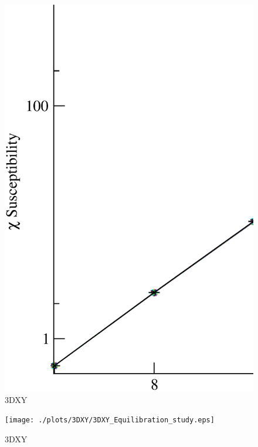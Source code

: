 \begin{figure}[!htpb]
  \centering
  \includegraphics[width=15cm]{./plots/3DXY/3DXY_Susceptibility_vs_L.eps}
  \caption{3DXY}
\end{figure}

\begin{figure}[!htpb]
  \centering
  \texttt{[image: ./plots/3DXY/3DXY\_Equilibration\_study.eps]}
  \caption{3DXY}
\end{figure}

